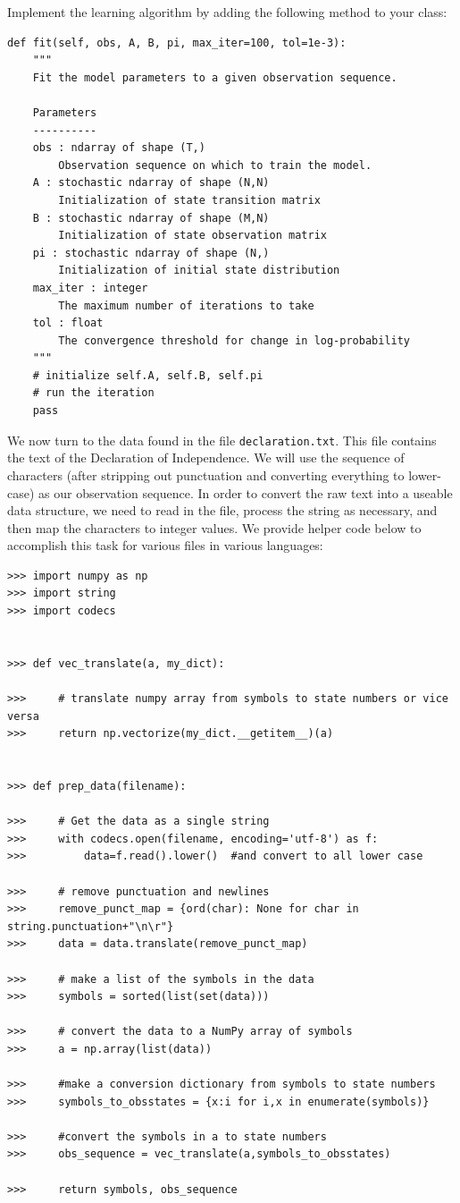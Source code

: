 \begin{problem}
Implement the learning algorithm by adding the following method to your class:
\begin{lstlisting}
def fit(self, obs, A, B, pi, max_iter=100, tol=1e-3):
    """
    Fit the model parameters to a given observation sequence.

    Parameters
    ----------
    obs : ndarray of shape (T,)
        Observation sequence on which to train the model.
    A : stochastic ndarray of shape (N,N)
        Initialization of state transition matrix
    B : stochastic ndarray of shape (M,N)
        Initialization of state observation matrix
    pi : stochastic ndarray of shape (N,)
        Initialization of initial state distribution
    max_iter : integer
        The maximum number of iterations to take
    tol : float
        The convergence threshold for change in log-probability
    """
    # initialize self.A, self.B, self.pi
    # run the iteration
    pass
\end{lstlisting}
\end{problem}

We now turn to the data found in the file {\tt declaration.txt}.
This file contains the text of the Declaration of Independence.
We will use the sequence of characters (after stripping out punctuation and converting everything to lower-case) as our observation sequence.
In order to convert the raw text into a useable data structure, we need to read in the file, process the string as necessary, and then map the characters to integer values.
We provide helper code below to accomplish this task for various files in various languages:
\begin{lstlisting}
>>> import numpy as np
>>> import string
>>> import codecs


>>> def vec_translate(a, my_dict):    

>>>     # translate numpy array from symbols to state numbers or vice versa
>>>     return np.vectorize(my_dict.__getitem__)(a)


>>> def prep_data(filename):
    
>>>     # Get the data as a single string
>>>     with codecs.open(filename, encoding='utf-8') as f:
>>>         data=f.read().lower()  #and convert to all lower case
    
>>>     # remove punctuation and newlines
>>>     remove_punct_map = {ord(char): None for char in string.punctuation+"\n\r"}
>>>     data = data.translate(remove_punct_map)

>>>     # make a list of the symbols in the data 
>>>     symbols = sorted(list(set(data)))

>>>     # convert the data to a NumPy array of symbols
>>>     a = np.array(list(data))
    
>>>     #make a conversion dictionary from symbols to state numbers
>>>     symbols_to_obsstates = {x:i for i,x in enumerate(symbols)}

>>>     #convert the symbols in a to state numbers
>>>     obs_sequence = vec_translate(a,symbols_to_obsstates)    
    
>>>     return symbols, obs_sequence
\end{lstlisting}

